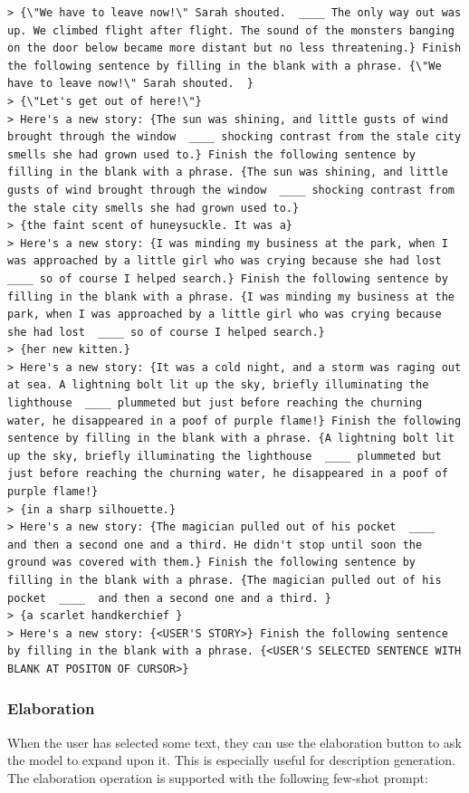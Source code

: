 \begin{lstlisting}
> {\"We have to leave now!\" Sarah shouted.  ____ The only way out was up. We climbed flight after flight. The sound of the monsters banging on the door below became more distant but no less threatening.} Finish the following sentence by filling in the blank with a phrase. {\"We have to leave now!\" Sarah shouted.  }
> {\"Let's get out of here!\"}
> Here's a new story: {The sun was shining, and little gusts of wind brought through the window  ____ shocking contrast from the stale city smells she had grown used to.} Finish the following sentence by filling in the blank with a phrase. {The sun was shining, and little gusts of wind brought through the window  ____ shocking contrast from the stale city smells she had grown used to.}
> {the faint scent of huneysuckle. It was a}
> Here's a new story: {I was minding my business at the park, when I was approached by a little girl who was crying because she had lost  ____ so of course I helped search.} Finish the following sentence by filling in the blank with a phrase. {I was minding my business at the park, when I was approached by a little girl who was crying because she had lost  ____ so of course I helped search.}
> {her new kitten.}
> Here's a new story: {It was a cold night, and a storm was raging out at sea. A lightning bolt lit up the sky, briefly illuminating the lighthouse  ____ plummeted but just before reaching the churning water, he disappeared in a poof of purple flame!} Finish the following sentence by filling in the blank with a phrase. {A lightning bolt lit up the sky, briefly illuminating the lighthouse  ____ plummeted but just before reaching the churning water, he disappeared in a poof of purple flame!}
> {in a sharp silhouette.}
> Here's a new story: {The magician pulled out of his pocket  ____  and then a second one and a third. He didn't stop until soon the ground was covered with them.} Finish the following sentence by filling in the blank with a phrase. {The magician pulled out of his pocket  ____  and then a second one and a third. }
> {a scarlet handkerchief }
> Here's a new story: {<USER'S STORY>} Finish the following sentence by filling in the blank with a phrase. {<USER'S SELECTED SENTENCE WITH BLANK AT POSITON OF CURSOR>}
\end{lstlisting}

\subsubsection{Elaboration}
When the user has selected some text, they can use the elaboration button to ask the model to expand upon it.
This is especially useful for description generation.
The elaboration operation is supported with the following few-shot prompt:

